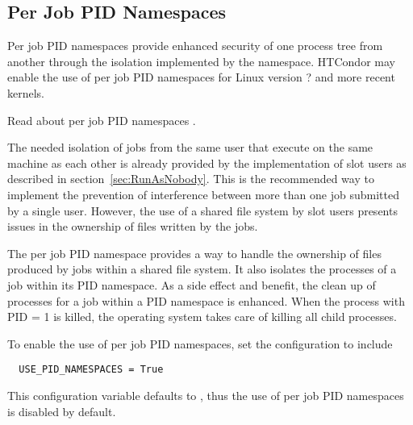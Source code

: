\subsection{\label{sec:PIDNamespaces}Per Job PID Namespaces} 

Per job PID namespaces provide enhanced security of one process
tree from another through the isolation implemented by the namespace.
HTCondor may enable the use of per job PID namespaces for 
Linux version ? and more recent kernels.

Read about per job PID namespaces .

The needed isolation of jobs from the same user that execute on the
same machine as each other is already provided by the implementation
of slot users as described in section~\ref{sec:RunAsNobody}.
This is the recommended way to implement the prevention of interference
between more than one job submitted by a single user.
However, the use of a shared file system by slot users presents
issues in the ownership of files written by the jobs.

The per job PID namespace provides a way to handle the ownership
of files produced by jobs within a shared file system.
It also isolates the processes of a job within its PID namespace.
As a side effect and benefit, the clean up of processes for a job
within a PID namespace is enhanced. 
When the process with PID = 1 is killed, 
the operating system takes care of killing all child processes.

To enable the use of per job PID namespaces, 
set the configuration to include

\begin{verbatim}
  USE_PID_NAMESPACES = True
\end{verbatim}

This configuration variable defaults to ,
thus the use of per job PID namespaces is disabled by default.
